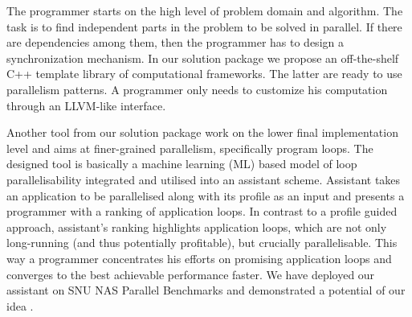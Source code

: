 \documentclass[10pt,a4paper]{report}
\begin{document}

\quad The programmer starts on the high level of problem domain and algorithm. The task is to find independent parts in the problem to be solved in parallel. If there are dependencies among them, then the programmer has to design a synchronization mechanism. In our solution package we propose an off-the-shelf C++ template library of computational frameworks. The latter are ready to use parallelism patterns. A programmer only needs to customize his computation through an LLVM-like interface.


\quad Another tool from our solution package work on the lower final implementation level and aims at finer-grained parallelism, specifically program loops. The designed tool is basically a machine learning (ML) based model of loop parallelisability integrated and utilised into an assistant scheme. Assistant takes an application to be parallelised along with its profile as an input and presents a programmer with a ranking of application loops. In contrast to a profile guided approach, assistant's ranking highlights application loops, which are not only long-running (and thus potentially profitable), but crucially parallelisable. This way a programmer concentrates his efforts on promising application loops and converges to the best achievable performance faster. We have deployed our assistant on SNU NAS Parallel Benchmarks \cite{snu-npb-benchmarks} \cite{nasa-parallel-benchmarks} and demonstrated a potential of our idea \cite{aiseps}.
\end{document}
